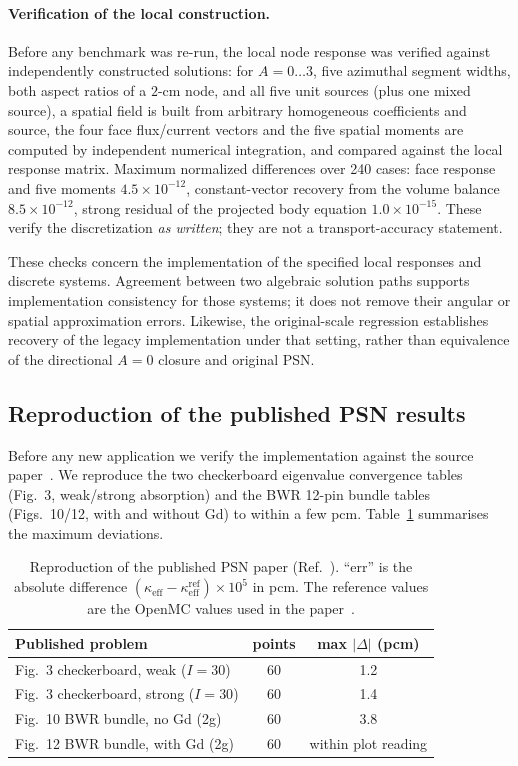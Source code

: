 \documentclass[11pt,a4paper]{article}
\newcommand{\keff}{\kappa_{\mathrm{eff}}}
\begin{document}
\paragraph{Verification of the local construction.}
Before any benchmark was re-run, the local node response was verified
against independently constructed solutions: for $A{=}0\ldots3$, five
azimuthal segment widths, both aspect ratios of a $2$-cm node, and all
five unit sources (plus one mixed source), a spatial field is built
from arbitrary homogeneous coefficients and source, the four face
flux/current vectors and the five spatial moments are computed by
independent numerical integration, and compared against the local
response matrix. Maximum normalized differences over 240 cases:
face response and five moments $4.5\times10^{-12}$, constant-vector
recovery from the volume balance $8.5\times10^{-12}$, strong residual
of the projected body equation $1.0\times10^{-15}$. These verify the
discretization \emph{as written}; they are not a transport-accuracy
statement.

These checks concern the implementation of the specified local responses
and discrete systems. Agreement between two algebraic solution paths
supports implementation consistency for those systems; it does not remove
their angular or spatial approximation errors. Likewise, the
original-scale regression establishes recovery of the legacy
implementation under that setting, rather than equivalence of the
directional $A{=}0$ closure and original PSN.

\subsection{Reproduction of the published PSN results}

Before any new application we verify the implementation against the
source paper~\cite{psn2027}. We reproduce the two checkerboard
eigenvalue convergence tables (Fig.~3, weak/strong absorption) and the
BWR 12-pin bundle tables (Figs.~10/12, with and without Gd) to within a
few pcm. Table~\ref{tab:repro} summarises the maximum deviations.

\begin{table}[h]
\centering
\caption{Reproduction of the published PSN paper
(Ref.~\cite{psn2027}). ``err'' is the absolute difference
$(\keff-\keff^{\mathrm{ref}})\times10^5$ in pcm. The reference values are
the OpenMC values used in the paper~\cite{openmc2015}.}
\label{tab:repro}
\small
\begin{tabular}{lcc}
\toprule
Published problem & points & max $|\Delta|$ (pcm) \\
\midrule
Fig.~3 checkerboard, weak ($I=30$) & 60 & 1.2 \\
Fig.~3 checkerboard, strong ($I=30$) & 60 & 1.4 \\
Fig.~10 BWR bundle, no Gd (2g) & 60 & 3.8 \\
Fig.~12 BWR bundle, with Gd (2g) & 60 & within plot reading \\
\bottomrule
\end{tabular}
\end{table}
\end{document}
